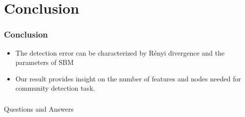 \documentclass[notheorems]{beamer}
\begin{document}
\section{Conclusion}
\begin{frame}
\frametitle{Conclusion}
\begin{itemize}
\item The detection error can be
characterized by Rényi divergence and the parameters of SBM
\item Our result provides insight on the
number of features and nodes needed for community
detection task.
\end{itemize}
\end{frame}

\begin{frame}
\frametitle{}
\begin{block}{}
\centering
{\Huge Questions and Answers}
\end{block}
\end{frame}
\end{document}

